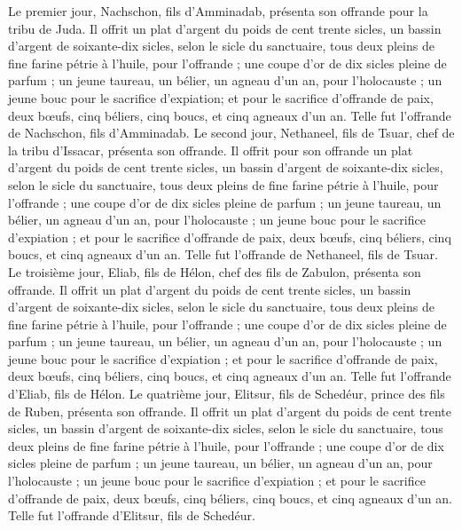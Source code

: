 \begin{multicols}{2}
Le premier jour, Nachschon, fils d’Amminadab, présenta son offrande pour la tribu de Juda.
Il offrit un plat d'argent du poids de cent trente sicles, un bassin d'argent de soixante-dix sicles, selon le sicle du sanctuaire, tous deux pleins de fine farine pétrie à l'huile, pour l’offrande ;
une coupe d'or de dix sicles pleine de parfum ;
un jeune taureau, un bélier, un agneau d'un an, pour l'holocauste ;
un jeune bouc pour le sacrifice d’expiation;
et pour le sacrifice d’offrande de paix, deux bœufs, cinq béliers, cinq boucs, et cinq agneaux d'un an. Telle fut l'offrande de Nachschon, fils d’Amminadab.
Le second jour, Nethaneel, fils de Tsuar, chef de la tribu d'Issacar, présenta son offrande.
Il offrit pour son offrande un plat d'argent du poids de cent trente sicles, un bassin d'argent de soixante-dix sicles, selon le sicle du sanctuaire, tous deux pleins de fine farine pétrie à l'huile, pour l’offrande ;
une coupe d'or de dix sicles pleine de parfum ;
un jeune taureau, un bélier, un agneau d'un an, pour l'holocauste ;
un jeune bouc pour le sacrifice d’expiation ;
et pour le sacrifice d’offrande de paix, deux bœufs, cinq béliers, cinq boucs, et cinq agneaux d'un an. Telle fut l'offrande de Nethaneel, fils de Tsuar.
Le troisième jour, Eliab, fils de Hélon, chef des fils de Zabulon, présenta son offrande.
Il offrit un plat d'argent du poids de cent trente sicles, un bassin d'argent de soixante-dix sicles, selon le sicle du sanctuaire, tous deux pleins de fine farine pétrie à l'huile, pour l’offrande ;
une coupe d'or de dix sicles pleine de parfum ;
un jeune taureau, un bélier, un agneau d'un an, pour l'holocauste ;
un jeune bouc pour le sacrifice d’expiation ;
et pour le sacrifice d’offrande de paix, deux bœufs, cinq béliers, cinq boucs, et cinq agneaux d'un an. Telle fut l'offrande d'Eliab, fils de Hélon.
Le quatrième jour, Elitsur, fils de Schedéur, prince des fils de Ruben, présenta son offrande.
Il offrit un plat d'argent du poids de cent trente sicles, un bassin d'argent de soixante-dix sicles, selon le sicle du sanctuaire, tous deux pleins de fine farine pétrie à l'huile, pour l’offrande ;
une coupe d'or de dix sicles pleine de parfum ;
un jeune taureau, un bélier, un agneau d'un an, pour l'holocauste ;
un jeune bouc pour le sacrifice d’expiation ;
et pour le sacrifice d’offrande de paix, deux bœufs, cinq béliers, cinq boucs, et cinq agneaux d'un an. Telle fut l'offrande d'Elitsur, fils de Schedéur.

\end{multicols}
